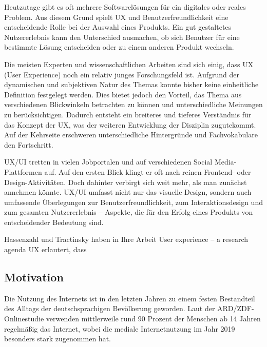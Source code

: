 \documentclass[12pt,oneside]{article}
\begin{document}
Heutzutage gibt es oft mehrere Softwarelösungen für ein digitales oder reales Problem. Aus diesem Grund spielt UX und Benutzerfreundlichkeit eine entscheidende Rolle bei der Auswahl eines Produkts. Ein gut gestaltetes Nutzererlebnis kann den Unterschied ausmachen, ob sich Benutzer für eine bestimmte Lösung entscheiden oder zu einem anderen Produkt wechseln.

Die meisten Experten und wissenschaftlichen Arbeiten sind sich einig, dass UX (User Experience) noch ein relativ junges Forschungsfeld ist. Aufgrund der dynamischen und subjektiven Natur des Themas konnte bisher keine einheitliche Definition festgelegt werden. Dies bietet jedoch den Vorteil, das Thema aus verschiedenen Blickwinkeln betrachten zu können und unterschiedliche Meinungen zu berücksichtigen. Dadurch entsteht ein breiteres und tieferes Verständnis für das Konzept der UX, was der weiteren Entwicklung der Disziplin zugutekommt.
Auf der Kehrseite erschweren unterschiedliche Hintergründe und Fachvokabulare den Fortschritt.\cite{glanznig}

UX/UI tretten in vielen Jobportalen und auf verschiedenen Social Media-Plattformen auf. Auf den ersten Blick klingt er oft nach reinen Frontend- oder Design-Aktivitäten. Doch dahinter verbirgt sich weit mehr, als man zunächst annehmen könnte. UX/UI umfasst nicht nur das visuelle Design, sondern auch umfassende Überlegungen zur Benutzerfreundlichkeit, zum Interaktionsdesign und zum gesamten Nutzererlebnis – Aspekte, die für den Erfolg eines Produkts von entscheidender Bedeutung sind.

Hassenzahl und Tractinsky haben in Ihre Arbeit User experience – a research agenda UX  erlautert, dass \cite{research}




\subsection{Motivation}

Die Nutzung des Internets ist in den letzten Jahren zu einem festen Bestandteil des Alltags der deutschsprachigen Bevölkerung geworden. Laut der ARD/ZDF-Onlinestudie \cite{ard} verwenden mittlerweile rund 90 Prozent der Menschen ab 14 Jahren regelmäßig das Internet, wobei die mediale Internetnutzung im Jahr 2019 besonders stark zugenommen hat.
\end{document}
